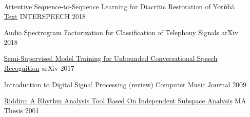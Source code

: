 
\begin{cvhonors}

  \cvhonor
    {\href{https://arxiv.org/abs/1804.00832}{Attentive Sequence-to-Sequence Learning for Diacritic Restoration of Yor{\`u}b{\'a} Text}} %
    {INTERSPEECH} %
    {} %
    {2018} %

  \cvhonor
    {Audio Spectrogram Factorization for Classification of Telephony Signals} %
    {arXiv} %
    {} %
    {2018} %

  \cvhonor
    {\href{https://arxiv.org/abs/1705.09724}{Semi-Supervised Model Training for Unbounded Conversational Speech Recognition}} %
    {arXiv} %
    {} %
    {2017} %

  \cvhonor
    {Introduction to Digital Signal Processing (review)} %
    {Computer Music Journal} %
    {} %
    {2009} %
        
  \cvhonor
    {\href{https://arxiv.org/abs/1705.04792}{Riddim: A Rhythm Analysis Tool Based On Independent Subspace Analysis}} %
    {MA Thesis} %
    {} %
    {2001} %
    
\end{cvhonors}
